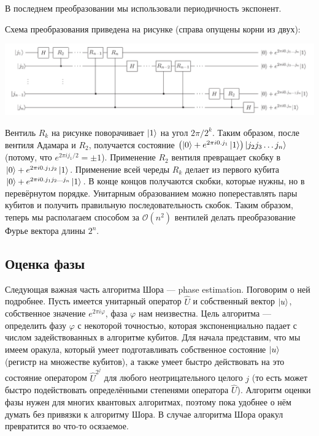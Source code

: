 \documentclass[12pt]{article}
\begin{document}
В последнем преобразовании мы использовали периодичность экспонент.

Схема преобразования приведена на рисунке (справа опущены корни из двух):
\begin{center}
\includegraphics[scale=0.45]{qfft.png}
\end{center}

Вентиль $R_k$ на рисунке поворачивает $\Ket{1}$ на угол $2 \pi / 2^k$. Таким образом, после вентиля Адамара и $R_2$, получается состояние $\left(\Ket{0} + e^{2 \pi i 0.j_1}\Ket{1}\right)\Ket{j_2 j_3 \ldots j_n}$ (потому, что $e^{2 \pi i j_1 / 2} = \pm 1$). Применение $R_2$ вентиля превращает скобку в $\Ket{0} + e^{2 \pi i 0.j_1 j_2} \Ket{1}$. Применение всей череды $R_k$ делает из первого кубита $\Ket{0} + e^{2 \pi i 0.j_1 j_2 \ldots j_n}\Ket{1}$. В конце концов получаются скобки, которые нужны, но в перевёрнутом порядке. Унитарным образованием можно попереставлять пары кубитов и получить правильную последовательность скобок. Таким образом, теперь мы располагаем способом за $\mathcal{O}(n^2)$ вентилей делать преобразование Фурье вектора длины $2^n$.

\subsection*{Оценка фазы}
Следующая важная часть алгоритма Шора --- phase estimation. Поговорим о ней подробнее. Пусть имеется унитарный оператор $\hat{U}$ и собственный вектор $\Ket{u}$, собственное значение $e^{2 \pi i \varphi}$, фаза $\varphi$ нам неизвестна. Цель алгоритма --- определить фазу $\varphi$ с некоторой точностью, которая экспоненциально падает с числом задействованных в алгоритме кубитов. Для начала представим, что мы имеем оракула, который умеет подготавливать собственное состояние $\Ket{u}$ (регистр на множестве кубитов), а также умеет быстро действовать на это состояние оператором $\hat{U}^{2^j}$ для любого неотрицательного целого $j$ (то есть может быстро подействовать определёнными степенями оператора $\hat{U}$). Алгоритм оценки фазы нужен для многих квантовых алгоритмах, поэтому пока удобнее о нём думать без привязки к алгоритму Шора. В случае алгоритма Шора оракул превратится во что-то осязаемое.
\end{document}
